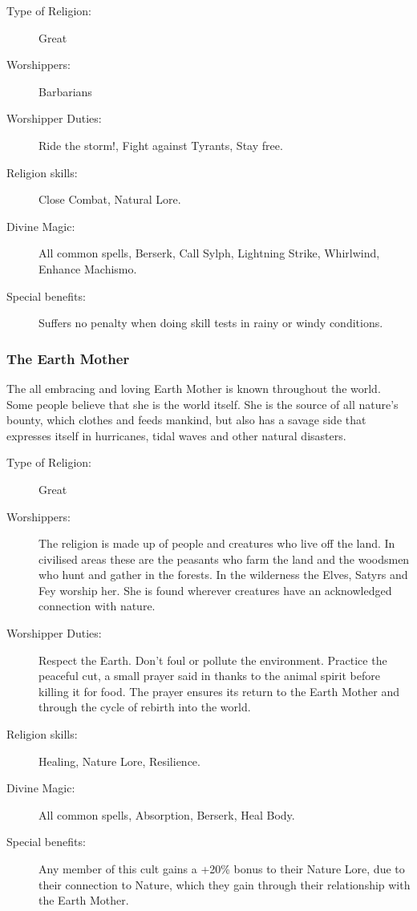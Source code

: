 \begin{description}
\item[Type of Religion:] Great
\item[Worshippers:] Barbarians
\item[Worshipper Duties:] Ride the storm!, Fight against Tyrants, Stay free.
\item[Religion skills:] Close Combat, Natural Lore.
\item[Divine Magic:] All common spells, Berserk, Call Sylph, Lightning Strike, Whirlwind, Enhance Machismo.
\item[Special benefits:] Suffers no penalty when doing skill tests in rainy or windy conditions.
\end{description}



\subsubsection{The Earth Mother}
The all embracing and loving Earth Mother is known throughout the world. Some people believe that she is the world itself. She is the source of all nature’s bounty, which clothes and feeds mankind, but also has a savage side that expresses itself in hurricanes, tidal waves and other natural disasters. 

\begin{description}
\item[Type of Religion:] Great
\item[Worshippers:] The religion is made up of people and creatures who live off the land. In civilised areas these are the peasants who farm the land and the woodsmen who hunt and gather in the forests. In the wilderness the Elves, Satyrs and Fey worship her. She is found wherever creatures have an acknowledged connection with nature.
\item[Worshipper Duties:] Respect the Earth. Don’t foul or pollute the environment. Practice the peaceful cut, a small prayer said in thanks to the animal spirit before killing it for food. The prayer ensures its return to the Earth Mother and through the cycle of rebirth into the world. 
\item[Religion skills:] Healing, Nature Lore, Resilience.
\item[Divine Magic:] All common spells, Absorption, Berserk, Heal Body.
\item[Special benefits:] Any member of this cult gains a +20\% bonus to their Nature Lore, due to their connection to Nature, which they gain through their relationship with the Earth Mother.
\end{description}



